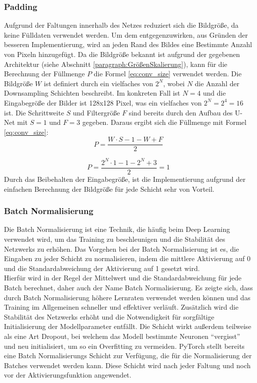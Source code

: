 \subsubsection{Padding}
Aufgrund der Faltungen innerhalb des Netzes reduziert sich die Bildgröße, da keine Fülldaten verwendet werden. Um dem entgegenzuwirken, aus Gründen der besseren Implementierung, wird an jeden Rand des Bildes eine Bestimmte Anzahl von Pixeln hinzugefügt. Da die Bildgröße bekannt ist aufgrund der gegebenen Architektur (siehe Abschnitt \ref{paragraph:GrößenSkalierung}), kann für die Berechnung der Füllmenge $P$ die Formel \ref{eq:conv_size} verwendet werden. Die Bildgröße $W$ ist definiert durch ein vielfaches von $2^N$, wobei $N$ die Anzahl der Downsampling Schichten beschreibt. Im konkreten Fall ist $N=4$ und die Eingabegröße der Bilder ist 128x128 Pixel, was ein vielfaches von $2^N=2^4=16$ ist. Die Schrittweite $S$ und Filtergröße $F$ sind bereits durch den Aufbau des U-Net mit $S=1$ und $F=3$ gegeben. Daraus ergibt sich die Füllmenge mit Formel \ref{eq:conv_size}:
\begin{equation}
	P = \dfrac{W \cdot S - 1 - W + F}{2}
\end{equation}

\begin{equation}
	P = \dfrac{2^N \cdot 1 - 1 - 2^N + 3}{2}  = 1
\end{equation}
Durch das Beibehalten der Eingabegröße, ist die Implementierung aufgrund der einfachen Berechnung der Bildgröße für jede Schicht sehr von Vorteil. 

\subsubsection{Batch Normalisierung}
Die Batch Normalisierung ist eine Technik, die häufig beim Deep Learning verwendet wird, um das Training zu beschleunigen und die Stabilität des Netzwerks zu erhöhen. Das Vorgehen bei der Batch Normalisierung ist es, die Eingaben zu jeder Schicht zu normalisieren, indem die mittlere Aktivierung auf 0 und die Standardabweichung der Aktivierung auf 1 gesetzt wird.\\
Hierfür wird in der Regel der Mittelwert und die Standardabweichung für jede Batch berechnet, daher auch der Name Batch Normalisierung. Es zeigte sich, dass durch Batch Normalisierung höhere Lernraten verwendet werden können und das Training im Allgemeinen schneller und effektiver verläuft. Zusätzlich wird die Stabilität des Netzwerks erhöht und die Notwendigkeit für sorgfältige Initialisierung der Modellparameter entfällt. Die Schicht wirkt außerdem teilweise als eine Art Dropout, bei welchem das Modell bestimmte Neuronen ``vergisst'' und neu initialisiert, um so ein Overfitting zu vermeiden.\cite[vgl.][]{Ioffe2015}
PyTorch stellt bereits eine Batch Normalisierungs Schicht zur Verfügung, die für die Normalisierung der Batches verwendet werden kann. Diese Schicht wird nach jeder Faltung und noch vor der Aktivierungsfunktion angewendet.

